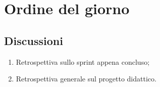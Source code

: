 \section{Ordine del giorno} \label{sec:agenda}
\subsection{Discussioni} \label{subsec:discussione}
\begin{enumerate}
    \item Retrospettiva sullo sprint appena concluso;
    \item Retrospettiva generale sul progetto didattico.
\end{enumerate}